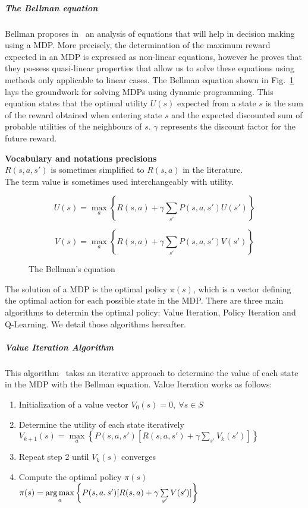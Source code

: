 \subparagraph{The Bellman equation}
Bellman proposes in~\cite{bellman1957} an analysis of equations that will help in decision making using a MDP. 
More precisely, the determination of the maximum reward expected in an MDP is expressed as non-linear equations, however he proves that they possess quasi-linear properties that allow us to solve these equations using methods only applicable to linear cases. 
The Bellman equation shown in Fig.~\ref{fig:bellmaneq} lays the groundwork for solving MDPs using dynamic programming.
This equation states that the optimal utility $U(s)$ expected from a state $s$ is the sum of the reward obtained when entering state $s$ and the expected discounted sum of probable utilities of the neighbours of $s$. $\gamma$ represents the discount factor for the future reward.

\textbf{Vocabulary and notations precisions}\\
$R(s,a,s')$ is sometimes simplified to $R(s,a)$ in the literature.\\
The term value is sometimes used interchangeably with utility.

\begin{figure}[h]
\[ U(s) = \max\limits_a \left \{R(s,a) + \gamma   \sum\limits_{s'} P(s,a,s')U(s') \right \} \]

\[ V(s) = \max\limits_a \left \{R(s,a) + \gamma   \sum\limits_{s'} P(s,a,s')V(s') \right \} \]

\caption{The Bellman's equation}
\label{fig:bellmaneq}
\end{figure}

The solution of a MDP is the optimal policy $\pi(s)$, which is a vector defining the optimal action for each possible state in the MDP.
There are three main algorithms to determin the optimal policy: Value Iteration, Policy Iteration and Q-Learning.
We detail those algorithms hereafter.


\subparagraph{Value Iteration Algorithm}
This algorithm~\cite{bellman1957} takes an iterative approach to determine the value of each state in the MDP with the Bellman equation.
Value Iteration works as follows:
\begin{enumerate}
    \item Initialization of a value vector $V_0(s)=0,~\forall s\in S$
    \item Determine the utility of each state iteratively\\{$V_{k+1}(s) = \max\limits_a \left \{ P(s,a,s')[R(s,a,s') + \gamma \sum\limits_{s'}V_k(s')] \right \}$}
    \item Repeat step 2 until $V_{k}(s)$ converges
    \item Compute the optimal policy $\pi(s)$\\$\pi(s) = \operatorname*{arg\,max}\limits_a \left \{P(s,a,s')[R(s,a) + \gamma \sum\limits_{s'}V(s')] \right \}$
\end{enumerate}

